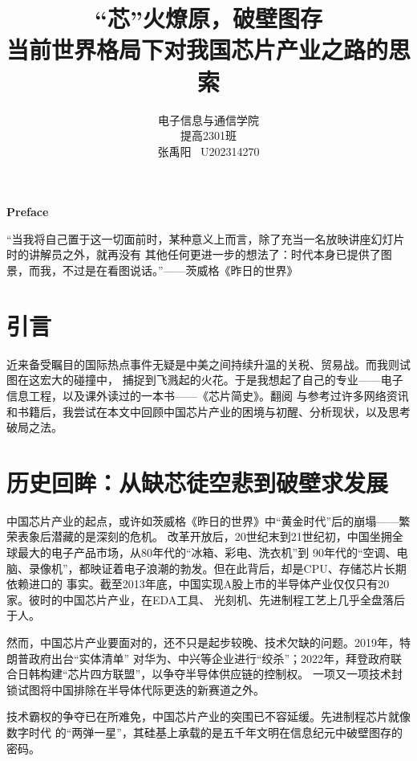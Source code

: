 \documentclass[a4paper,11pt,UTF8]{article}
\begin{document}
	
\title{\huge “芯”火燎原，破壁图存 \\ 当前世界格局下对我国芯片产业之路的思索} 
\author{电子信息与通信学院 \\ 提高2301班 \\ 张禹阳 \ U202314270}

\maketitle

\begin{center}
    \Large\textbf{Preface} \\[1em]
\end{center}
\vspace{2em}

	“当我将自己置于这一切面前时，某种意义上而言，除了充当一名放映讲座幻灯片时的讲解员之外，就再没有
其他任何更进一步的想法了：时代本身已提供了图景，而我，不过是在看图说话。”——茨威格《昨日的世界》

\tableofcontents

\section{引言}
	近来备受瞩目的国际热点事件无疑是中美之间持续升温的关税、贸易战。而我则试图在这宏大的碰撞中，
捕捉到飞溅起的火花。于是我想起了自己的专业——电子信息工程，以及课外读过的一本书——《芯片简史》。翻阅
与参考过许多网络资讯和书籍后，我尝试在本文中回顾中国芯片产业的困境与初醒、分析现状，以及思考破局之法。

\section{历史回眸：从缺芯徒空悲到破壁求发展}
	中国芯片产业的起点，或许如茨威格《昨日的世界》中“黄金时代”后的崩塌——繁荣表象后潜藏的是深刻的危机。
改革开放后，20世纪末到21世纪初，中国坐拥全球最大的电子产品市场，从80年代的“冰箱、彩电、洗衣机”到
90年代的“空调、电脑、录像机”，都映证着电子浪潮的勃发。但在此背后，却是CPU、存储芯片长期依赖进口的
事实。截至2013年底，中国实现A股上市的半导体产业仅仅只有20家。彼时的中国芯片产业，在EDA工具、
光刻机、先进制程工艺上几乎全盘落后于人。
	
	然而，中国芯片产业要面对的，还不只是起步较晚、技术欠缺的问题。2019年，特朗普政府出台“实体清单”
对华为、中兴等企业进行“绞杀”；2022年，拜登政府联合日韩构建“芯片四方联盟”，以争夺半导体供应链的控制权。
一项又一项技术封锁试图将中国排除在半导体代际更迭的新赛道之外。
	
	技术霸权的争夺已在所难免，中国芯片产业的突围已不容延缓。先进制程芯片就像数字时代
的“两弹一星”，其硅基上承载的是五千年文明在信息纪元中破壁图存的密码。
\end{document}

